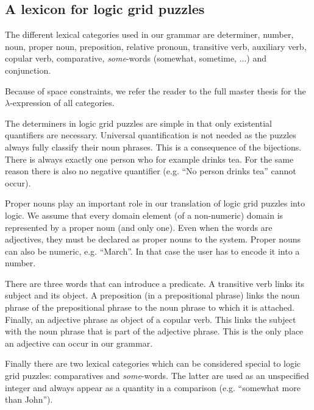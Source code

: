 \subsection{A lexicon for logic grid puzzles}
The different lexical categories used in our grammar are determiner, number, noun, proper noun, preposition, relative pronoun, transitive verb, auxiliary verb, copular verb, comparative, \textit{some}-words (somewhat, sometime, ...) and conjunction.

Because of space constraints, we refer the reader to the full master thesis for the $\lambda$-expression of all categories.

The determiners in logic grid puzzles are simple in that only existential quantifiers are necessary. Universal quantification is not needed as the puzzles always fully classify their noun phrases. This is a consequence of the bijections. There is always exactly one person who for example drinks tea. For the same reason there is also no negative quantifier (e.g. ``No person drinks tea'' cannot occur).

Proper nouns play an important role in our translation of logic grid puzzles into logic. We assume that every domain element (of a non-numeric) domain is represented by a proper noun (and only one). Even when the words are adjectives, they must be declared as proper nouns to the system.
Proper nouns can also be numeric, e.g. ``March''. In that case the user has to encode it into a number.

There are three words that can introduce a predicate. A transitive verb links its subject and its object. A preposition (in a prepositional phrase) links the noun phrase of the prepositional phrase to the noun phrase to which it is attached. Finally, an adjective phrase as object of a copular verb. This links the subject with the noun phrase that is part of the adjective phrase. This is the only place an adjective can occur in our grammar.



Finally there are two lexical categories which can be considered special to logic grid puzzles: comparatives and \textit{some}-words. The latter are used as an unspecified integer and always appear as a quantity in a comparison (e.g. ``somewhat more than John'').
